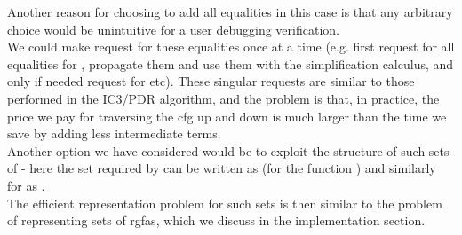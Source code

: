 Another reason for choosing to add all equalities in this case is that any arbitrary choice would be unintuitive for a user debugging verification.\\
We could make  request for these equalities once at a time (e.g. first request for all equalities for , 
propagate them and use them with the simplification calculus, and only if needed request for  etc).
These singular requests are similar to those performed in the IC3/PDR algorithm, and the problem is that, in practice, the price we pay for traversing the cfg up and down is much larger than the time we save by adding less intermediate terms.\\
Another option we have considered would be to exploit the structure of such sets of \GFAs{} - here the set required by  can be written as (for the function )  and similarly for  as .\\
The efficient representation problem for such sets is then similar to the problem of representing sets of rgfas, which we discuss in the implementation section.
